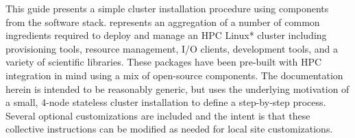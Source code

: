 This guide presents a simple cluster installation procedure using components
from the \OHPC{} software stack. \OHPC{} represents an aggregation of a number
of common ingredients required to deploy and manage an HPC Linux* cluster
including provisioning tools, resource management, I/O clients, development
tools, and a variety of scientific libraries. These packages have been
pre-built with HPC integration in mind using a mix of open-source components.
The documentation herein is intended to
be reasonably generic, but uses the underlying motivation of a small, 4-node
stateless cluster installation to define a step-by-step process. Several
optional customizations are included and the intent is that these collective
instructions can be modified as needed for local site customizations.
